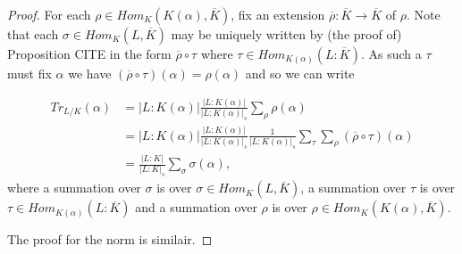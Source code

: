 \documentclass[twoside, a4paper, 10pt]{amsart}
\begin{document}
\begin{proof} For each $\rho \in Hom_{K}(K(\alpha), \overline{K})$, fix an extension $\overline{\rho}:\overline{K} \to \overline{K}$ of $\rho$. Note that each $\sigma \in Hom_{K}(L, \overline{K})$ may be uniquely written by (the proof of) Proposition CITE in the form $\overline{\rho} \circ \tau$ where $\tau \in Hom_{K(\alpha)}(L : \overline{K})$. As such a $\tau$ must fix $\alpha$ we have $(\overline{\rho} \circ \tau) (\alpha) = \rho(\alpha)$ and so we can write 

\begin{align*}Tr_{L/K}(\alpha) &= |L:K(\alpha)| \frac{|L:K(\alpha)|}{|L:K(\alpha)|_s} \sum_{\rho} \rho(\alpha) \\ 
&= |L:K(\alpha)| \frac{|L:K(\alpha)|}{|L:K(\alpha)|_s} \frac{1}{|L:K(\alpha)|_s} \sum_{\tau} \sum_{\rho} (\overline{\rho} \circ \tau)(\alpha) \\
&= \frac{|L:K|}{|L:K|_s} \sum_{\sigma} \sigma(\alpha), \end{align*} where a summation over $\sigma$ is over $\sigma \in  Hom_{K}(L, \overline{K})$, a summation over $\tau$ is over $ \tau \in Hom_{K(\alpha)}(L : \overline{K})$ and a summation over $\rho$ is over  $\rho \in Hom_{K}(K(\alpha), \overline{K})$.

The proof for the norm is similair.\end{proof}
\end{document}
